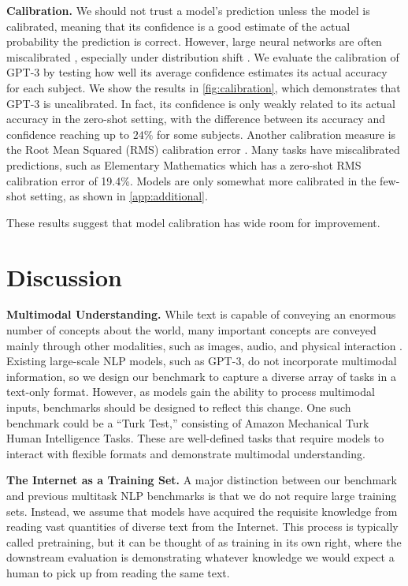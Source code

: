 \textbf{Calibration.}\quad
We should not trust a model's prediction unless the model is calibrated, meaning that its confidence is a good estimate of the actual probability the prediction is correct. However, large neural networks are often miscalibrated \citep{kilian2017calibration}, especially under distribution shift \citep{ovadia2019can}. We evaluate the calibration of GPT-3 by testing how well its average confidence estimates its actual accuracy for each subject. We show the results in \ref{fig:calibration}, which demonstrates that GPT-3 is uncalibrated. In fact, its confidence is only weakly related to its actual accuracy in the zero-shot setting, with the difference between its accuracy and confidence reaching up to $24\%$ for some subjects. Another calibration measure is the Root Mean Squared (RMS) calibration error \citep{hendrycks2019oe,kumar2019verifiedcalibration}. Many tasks have miscalibrated predictions, such as Elementary Mathematics which has a zero-shot RMS calibration error of 19.4\%. Models are only somewhat more calibrated in the few-shot setting, as shown in \ref{app:additional}.

These results suggest that model calibration has wide room for improvement.

\section{Discussion}
\textbf{Multimodal Understanding.}\quad
While text is capable of conveying an enormous number of concepts about the world, many important concepts are conveyed mainly through other modalities, such as images, audio, and physical interaction \citep{bisk2020experiencegroundslang}. Existing large-scale NLP models, such as GPT-3, do not incorporate multimodal information, so we design our benchmark to capture a diverse array of tasks in a text-only format. However, as models gain the ability to process multimodal inputs, benchmarks should be designed to reflect this change. One such benchmark could be a ``Turk Test,'' consisting of Amazon Mechanical Turk Human Intelligence Tasks. These are well-defined tasks that require models to interact with flexible formats and demonstrate multimodal understanding.

\textbf{The Internet as a Training Set.}\quad
A major distinction between our benchmark and previous multitask NLP benchmarks is that we do not require large training sets. Instead, we assume that models have acquired the requisite knowledge from reading vast quantities of diverse text from the Internet. This process is typically called pretraining, but it can be thought of as training in its own right, where the downstream evaluation is demonstrating whatever knowledge we would expect a human to pick up from reading the same text. 

